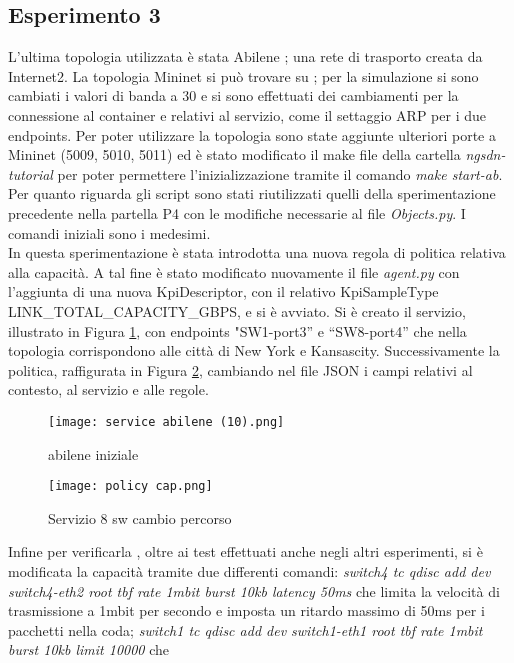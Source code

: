 \subsection{Esperimento 3}
L'ultima topologia utilizzata è stata Abilene \cite{abilene}; una rete di trasporto creata da Internet2.
La topologia Mininet si può trovare su \cite{topab}; per la simulazione si sono cambiati i valori di banda a 30
e si sono effettuati dei cambiamenti per la connessione al container e relativi al servizio, come il settaggio ARP per i due endpoints. 
Per poter utilizzare la topologia sono state aggiunte ulteriori porte a Mininet (5009, 5010, 5011) ed è stato modificato il 
make file della cartella \textit{ngsdn-tutorial} per poter permettere l'inizializzazione tramite il comando \textit{make start-ab}.
\\Per quanto riguarda gli script sono stati riutilizzati quelli della sperimentazione precedente nella partella P4 \cite{ofc} con le 
modifiche necessarie al file \textit{Objects.py}. 
I comandi iniziali sono i medesimi.
\\In questa sperimentazione è stata introdotta una nuova regola di politica relativa alla capacità.
A tal fine è stato modificato nuovamente il file \textit{agent.py} con l'aggiunta di una nuova KpiDescriptor, con il relativo KpiSampleType LINK\_TOTAL\_CAPACITY\_GBPS, e si è avviato.
Si è creato il servizio, illustrato in Figura \ref{fig:abilene}, con endpoints "SW1-port3” e “SW8-port4” che nella topologia corrispondono alle città di New York e Kansascity.
Successivamente la politica, raffigurata in Figura \ref{fig:policy cap}, cambiando nel file JSON i campi relativi
al contesto, al servizio e alle regole.
\begin{figure}[h]
    \centering
   \texttt{[image: service abilene (10).png]}
    \caption{abilene iniziale}
    \label{fig:abilene}
\end{figure}
\begin{figure}[h]
    \centering
   \texttt{[image: policy cap.png]}
    \caption{Servizio 8 sw cambio percorso}
    \label{fig:policy cap}
\end{figure}
Infine per verificarla , oltre ai test effettuati anche negli altri esperimenti, 
si è modificata la capacità tramite due differenti comandi: \textit{switch4 tc qdisc add dev switch4-eth2 root tbf rate 1mbit burst 10kb latency 50ms} che 
limita la velocità di trasmissione a 1mbit per secondo e imposta un ritardo massimo di 50ms per i pacchetti nella coda; 
\textit{switch1 tc qdisc add dev switch1-eth1 root tbf rate 1mbit burst 10kb limit 10000} che

